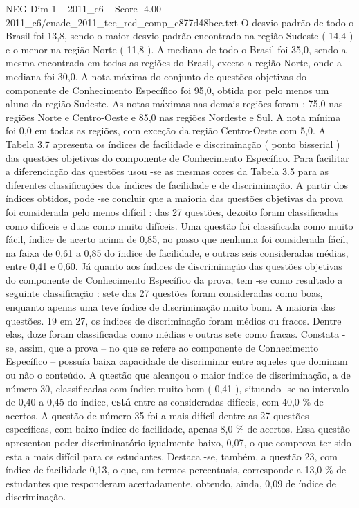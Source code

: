 \begin{textsample}{NEG Dim 1 – 2011\_c6 – Score -4.00 – 2011\_c6/enade\_2011\_tec\_red\_comp\_c877d48bcc.txt}
O desvio padrão de todo o Brasil foi 13,8, sendo o maior desvio padrão encontrado na região Sudeste ( 14,4 ) e o menor na região Norte ( 11,8 ).
A mediana de todo o Brasil foi 35,0, sendo a mesma encontrada em todas as regiões do Brasil, exceto a região Norte, onde a mediana foi 30,0.
A nota máxima do conjunto de questões objetivas do componente de Conhecimento Específico foi 95,0, obtida por pelo menos um aluno da região Sudeste.
As notas máximas nas demais regiões foram : 75,0 nas regiões Norte e Centro-Oeste e 85,0 nas regiões Nordeste e Sul.
A nota mínima foi 0,0 em todas as regiões, com exceção da região Centro-Oeste com 5,0.
A Tabela 3.7 apresenta os índices de facilidade e discriminação ( ponto bisserial ) das questões objetivas do componente de Conhecimento Específico.
Para facilitar a diferenciação das questões usou -se as mesmas cores da Tabela 3.5 para as diferentes classificações dos índices de facilidade e de discriminação.
A partir dos índices obtidos, pode -se concluir que a maioria das questões objetivas da prova foi considerada pelo menos difícil : das 27 questões, dezoito foram classificadas como difíceis e duas como muito difíceis.
Uma questão foi classificada como muito fácil, índice de acerto acima de 0,85, ao passo que nenhuma foi considerada fácil, na faixa de 0,61 a 0,85 do índice de facilidade, e outras seis consideradas médias, entre 0,41 e 0,60.
Já quanto aos índices de discriminação das questões objetivas do componente de Conhecimento Específico da prova, tem -se como resultado a seguinte classificação : sete das 27 questões foram consideradas como boas, enquanto apenas uma teve índice de discriminação muito bom.
A maioria das questões. 19 em 27, os índices de discriminação foram médios ou fracos.
Dentre elas, doze foram classificadas como médias e outras sete como fracas.
Constata -se, assim, que a prova – no que se refere ao componente de Conhecimento Específico – possuía baixa capacidade de discriminar entre aqueles que dominam ou não o conteúdo.
A questão que alcançou o maior índice de discriminação, a de número 30, classificadas com índice muito bom ( 0,41 ), situando -se no intervalo de 0,40 a 0,45 do índice, \textbf{está} entre as consideradas difíceis, com 40,0 \% de acertos.
A questão de número 35 foi a mais difícil dentre as 27 questões específicas, com baixo índice de facilidade, apenas 8,0 \% de acertos.
Essa questão apresentou poder discriminatório igualmente baixo, 0,07, o que comprova ter sido esta a mais difícil para os estudantes.
Destaca -se, também, a questão 23, com índice de facilidade 0,13, o que, em termos percentuais, corresponde a 13,0 \% de estudantes que responderam acertadamente, obtendo, ainda, 0,09 de índice de discriminação.

\end{textsample}
